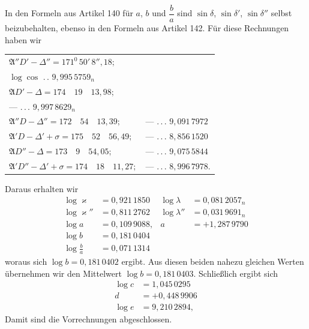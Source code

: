 In den Formeln aus Artikel 140 für $a$, $b$ und $\dfrac b a$ sind $\sin\delta$, $\sin\delta'$, $\sin\delta''$ selbst beizubehalten, ebenso in den Formeln aus Artikel 142. Für diese Rechnungen haben wir
\begin{center}\begingroup\footnotesize\setlength{\tabcolsep}{4pt}\renewcommand{\arraystretch}{1.3}
\begin{tabular}{ll}
$\mathfrak A''D'-\Delta''=171^0\,50'\,8''{,}18;$ & \shortstack{$\log\sin$ .\,.\,. $9{,}152\,3306;$\\$\log\cos$ .\,. $9{,}995\,5759_n$}\\
$\mathfrak AD'-\Delta=174\quad19\quad13{,}98;$ & \shortstack{--- .\,.\,. $8{,}995\,4722;$\\--- .\,.\,. $9{,}997\,8629_n$}\\
$\mathfrak A''D-\Delta''=172\quad54\quad13{,}39;$ & --- .\,.\,. $9{,}091\,7972$\\
$\mathfrak A'D-\Delta'+\sigma=175\quad52\quad56{,}49;$ & --- .\,.\,. $8{,}856\,1520$\\
$\mathfrak AD''-\Delta=173\quad9\quad54{,}05;$ & --- .\,.\,. $9{,}075\,5844$\\
$\mathfrak A'D''-\Delta'+\sigma=174\quad18\quad11{,}27;$ & --- .\,.\,. $8{,}996\,7978$.
\end{tabular}\endgroup\end{center}
\noindent Daraus erhalten wir
\[
\begin{aligned}
\log\varkappa&=0{,}921\,1850&\log\lambda&=0{,}081\,2057_n\\
\log\varkappa''&=0{,}811\,2762&\log\lambda''&=0{,}031\,9691_n\\
\log a&=0{,}109\,9088,&a&=+1{,}287\,9790\\
\log b&=0{,}181\,0404&&\\
\log\frac b a&=0{,}071\,1314&&
\end{aligned}
\]
\noindent woraus sich $\log b=0{,}181\,0402$ ergibt. Aus diesen beiden nahezu gleichen Werten übernehmen wir den Mittelwert $\log b=0{,}181\,0403$. Schließlich ergibt sich
\[
\begin{aligned}
\log c&=1{,}045\,0295\\
d&=+0{,}448\,9906\\
\log e&=9{,}210\,2894,
\end{aligned}
\]
\noindent Damit sind die Vorrechnungen abgeschlossen.

